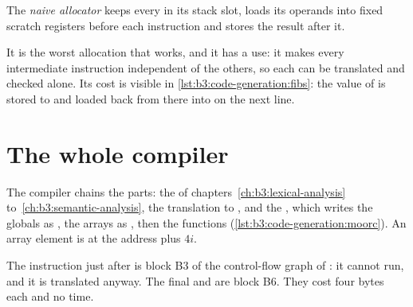 \begin{definition}\label{def:b3:code-generation:naive}
The \emph{naive allocator} keeps every  in its stack slot, loads its operands into fixed scratch registers before each instruction and stores the result after it.
\end{definition}

It is the worst allocation that works, and it has a use: it makes every intermediate instruction independent of the others, so each can be translated and checked alone. Its cost is visible in \cref{lst:b3:code-generation:fibs}: the value of  is stored to  and loaded back from there into  on the next line.

\section{The whole compiler}\label{sec:b3:code-generation:moorc}

The compiler  chains the parts: the  of chapters~\ref{ch:b3:lexical-analysis} to~\ref{ch:b3:semantic-analysis}, the translation to , and the , which writes the globals as , the arrays as , then the functions (\cref{lst:b3:code-generation:moorc}). An array element  is at the address  plus $4i$.

\label{lst:b3:code-generation:moorc}

\label{out:b3:code-generation:compilefib}

\label{lst:b3:code-generation:fibs}

\begin{remark}
The instruction  just after  is block B3 of the control-flow graph of : it cannot run, and it is translated anyway. The final  and  are block B6. They cost four bytes each and no time.
\end{remark}

